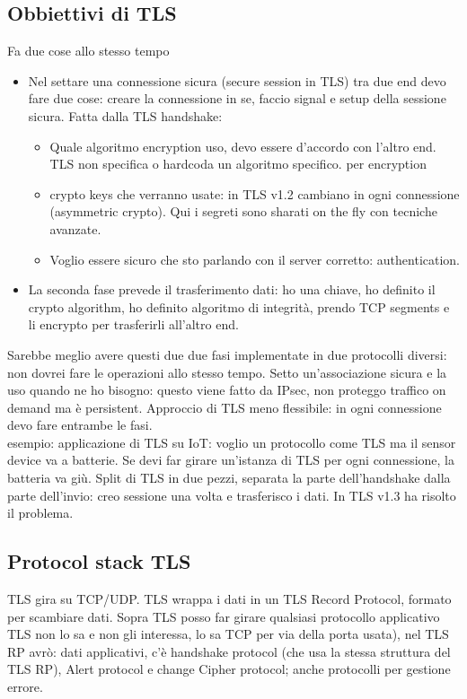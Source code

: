 \documentclass[16px]{article}
\begin{document}
\subsection{Obbiettivi di TLS}
Fa due cose allo stesso tempo
\begin{itemize}
\item Nel settare una connessione sicura (secure session in TLS) tra due end devo fare due cose: creare la connessione in se, faccio signal e setup della sessione sicura. Fatta dalla TLS handshake:
\begin{itemize}
\item Quale algoritmo encryption uso, devo essere d'accordo con l'altro end. TLS non specifica o hardcoda un algoritmo specifico. per encryption
\item crypto keys che verranno usate: in TLS v1.2 cambiano in ogni connessione (asymmetric crypto). Qui i segreti sono sharati on the fly con tecniche avanzate.
\item Voglio essere sicuro che sto parlando con il server corretto: authentication.
\end{itemize}
\item La seconda fase prevede il trasferimento dati: ho una chiave, ho definito il crypto algorithm, ho definito algoritmo di integrità, prendo TCP segments e li encrypto per trasferirli all'altro end.
\end{itemize}
Sarebbe meglio avere questi due due fasi implementate in due protocolli diversi: non dovrei fare le operazioni allo stesso tempo. Setto un'associazione sicura e la uso quando ne ho bisogno: questo viene fatto da IPsec, non proteggo traffico on demand ma è persistent. Approccio di TLS meno flessibile: in ogni connessione devo fare entrambe le fasi.
\\ esempio: applicazione di TLS su IoT: voglio un protocollo come TLS ma il sensor device va a batterie. Se devi far girare un'istanza di TLS per ogni connessione, la batteria va giù. Split di TLS in due pezzi, separata la parte dell'handshake dalla parte dell'invio: creo sessione una volta e trasferisco i dati. In TLS v1.3 ha risolto il problema.
\subsection{Protocol stack TLS}
TLS gira su TCP/UDP. TLS wrappa i dati in un TLS Record Protocol, formato per scambiare dati. Sopra TLS posso far girare qualsiasi protocollo applicativo TLS non lo sa e non gli interessa, lo sa TCP per via della porta usata), nel TLS RP avrò: dati applicativi, c'è handshake protocol (che usa la stessa struttura del TLS RP), Alert protocol e change Cipher protocol; anche protocolli per gestione errore.
\end{document}
